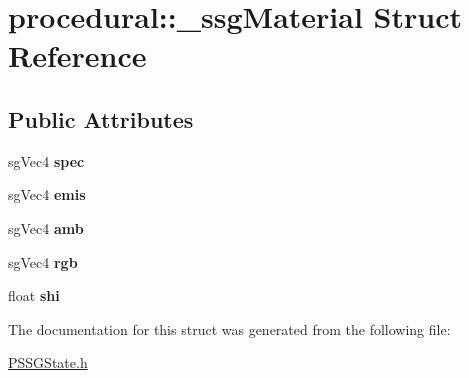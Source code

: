 \hypertarget{structprocedural_1_1__ssg_material}{\section{procedural\-:\-:\-\_\-ssg\-Material Struct Reference}
\label{structprocedural_1_1__ssg_material}
}
\subsection*{Public Attributes}
\begin{DoxyCompactItemize}
\item 
\hypertarget{structprocedural_1_1__ssg_material_a0e51187390a42d56c51860b20c5f3d04}{sg\-Vec4 {\bfseries spec}}\label{structprocedural_1_1__ssg_material_a0e51187390a42d56c51860b20c5f3d04}

\item 
\hypertarget{structprocedural_1_1__ssg_material_ad4dd2c13380dd75828e1533c41bb4828}{sg\-Vec4 {\bfseries emis}}\label{structprocedural_1_1__ssg_material_ad4dd2c13380dd75828e1533c41bb4828}

\item 
\hypertarget{structprocedural_1_1__ssg_material_ab8b71d1b095bf81cdc2c3fd858a364b4}{sg\-Vec4 {\bfseries amb}}\label{structprocedural_1_1__ssg_material_ab8b71d1b095bf81cdc2c3fd858a364b4}

\item 
\hypertarget{structprocedural_1_1__ssg_material_af939edf5d4aca667e5e22f6f20549a52}{sg\-Vec4 {\bfseries rgb}}\label{structprocedural_1_1__ssg_material_af939edf5d4aca667e5e22f6f20549a52}

\item 
\hypertarget{structprocedural_1_1__ssg_material_a4032ef080380738eb6e4a309ca55dafc}{float {\bfseries shi}}\label{structprocedural_1_1__ssg_material_a4032ef080380738eb6e4a309ca55dafc}

\end{DoxyCompactItemize}


The documentation for this struct was generated from the following file\-:\begin{DoxyCompactItemize}
\item 
\hyperlink{_p_s_s_g_state_8h}{P\-S\-S\-G\-State.\-h}\end{DoxyCompactItemize}
